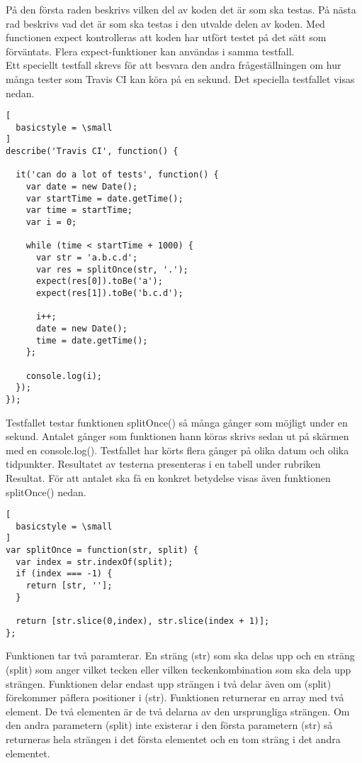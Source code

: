 På den första raden beskrivs vilken del av koden det är som ska testas.
På nästa rad beskrivs vad det är som ska testas i den utvalde delen av koden.
Med functionen expect kontrolleras att koden har utfört testet på det sätt
som förväntats. Flera expect-funktioner kan användas i samma testfall.\\

Ett speciellt testfall skrevs
för att besvara den andra frågeställningen om hur många tester som 
Travis CI kan köra
på en sekund. Det speciella testfallet visas nedan.

\begin{lstlisting}[
  basicstyle = \small
]
describe('Travis CI', function() {
	
  it('can do a lot of tests', function() {
    var date = new Date();
    var startTime = date.getTime();
    var time = startTime;
    var i = 0;

    while (time < startTime + 1000) {  
      var str = 'a.b.c.d';
      var res = splitOnce(str, '.');
      expect(res[0]).toBe('a');
      expect(res[1]).toBe('b.c.d');

      i++;
      date = new Date(); 
      time = date.getTime();
    };

    console.log(i);
  });
});
\end{lstlisting}

Testfallet testar funktionen splitOnce() så många gånger som möjligt
under en sekund. Antalet gånger som funktionen hann köras skrivs
sedan ut på skärmen med en console.log(). 
Testfallet har körts flera gånger på olika datum och olika tidpunkter.
Resultatet av testerna presenteras i en tabell under rubriken Resultat.
För att antalet ska
få en konkret betydelse visas även funktionen splitOnce() nedan.

\begin{lstlisting}[
  basicstyle = \small
]
var splitOnce = function(str, split) {
  var index = str.indexOf(split);
  if (index === -1) {
    return [str, ''];
  }

  return [str.slice(0,index), str.slice(index + 1)];
};
\end{lstlisting}

Funktionen tar två paramterar. En sträng (str) som ska delas upp och 
en sträng (split) som anger vilket tecken eller vilken teckenkombination
som ska dela upp strängen. Funktionen delar endast upp strängen i två delar
även om (split) förekommer påflera positioner i (str). Funktionen returnerar 
en array med två element.
De två elementen är de två delarna av den ursprungliga strängen. Om den andra
parametern (split) inte existerar i den första parametern (str) så returneras
hela strängen i det första elementet och en tom sträng i det andra elementet.\\

